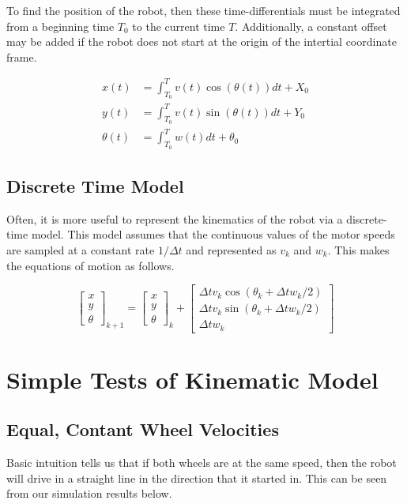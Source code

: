 \documentclass[10pt]{amsart}
\begin{document}
To find the position of the robot, then these time-differentials must be integrated from a beginning time $T_{0}$ to the current time $T$.  Additionally, a constant offset may be added if the robot does not start
at the origin of the intertial coordinate frame.

\begin{equation}
\begin{align}
 x(t) &= \int_{T_{0}}^{T} v(t) \cos{(\theta(t))} dt + X_{0} \\
 y(t) &= \int_{T_{0}}^{T} v(t) \sin{(\theta(t))} dt + Y_{0} \\
 \theta(t) &= \int_{T_{0}}^{T} w(t) dt + \theta_{0}
\end{align}
\end{equation}

\subsection{Discrete Time Model}
Often, it is more useful to represent the kinematics of the robot via a discrete-time model.  This model assumes that the continuous values of the motor speeds are sampled at a 
constant rate $1/\Delta t$ and represented as $v_k$ and $w_k$.  This makes the equations of motion as follows.

\begin{equation}
 \begin{bmatrix}
  x \\ y \\ \theta
 \end{bmatrix}_{k+1} = 
 \begin{bmatrix}
  x \\ y \\ \theta
 \end{bmatrix}_{k} + 
 \begin{bmatrix}
  \Delta t v_k \cos{(\theta_k + \Delta t w_k/2)}\\
  \Delta t v_k \sin{(\theta_k + \Delta t w_k/2)}\\
  \Delta t w_k
 \end{bmatrix}
\end{equation}

\section{Simple Tests of Kinematic Model}
\subsection{Equal, Contant Wheel Velocities}
Basic intuition tells us that if both wheels are at the same speed, then the robot will drive in a straight line in the direction that it started in.  This can be seen from our simulation results below.
\end{document}
